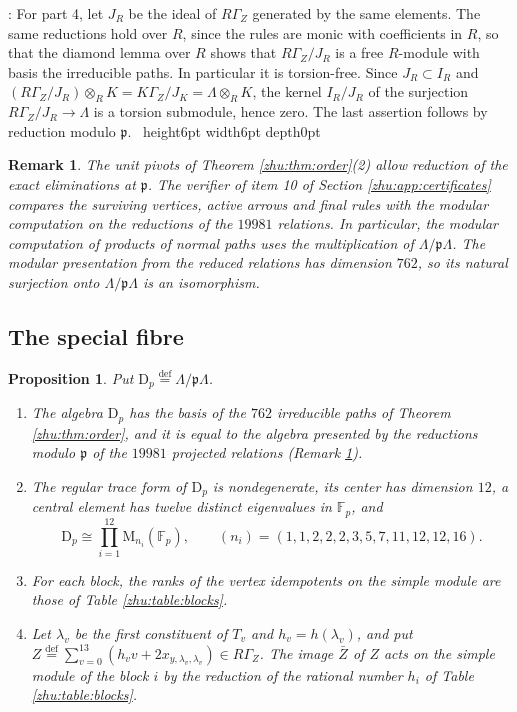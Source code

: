 \documentclass[leqno]{article}
\newcommand{\D}{\mathrm{D}}
\newcommand{\M}{\mathrm{M}}
\newcommand{\qed}{\hfill \vrule height6pt  width6pt depth0pt}
\newcommand{\ot}{\otimes}
\newcommand{\ov}{\overset}
\newtheorem{prop}[thm]{Proposition}
\newtheorem{remark}[thm]{Remark}
\newenvironment{proof}[1][]{\noindent {\it Proof #1} : }{\hbox{~}\qed
\smallskip
}
\numberwithin{equation}{section}
\begin{document}
\begin{proof}
For part 4, let $J_R$ be the ideal of $R\Gamma_Z$ generated by the same elements. The same reductions hold over $R$, since the rules are monic with coefficients in $R$, so that the diamond lemma over $R$ shows that $R\Gamma_Z/J_R$ is a free $R$-module with basis the irreducible paths. In particular it is torsion-free. Since $J_R \subset I_R$ and $(R\Gamma_Z/J_R) \ot_R K = K\Gamma_Z/J_K = \Lambda \ot_R K$, the kernel $I_R/J_R$ of the surjection $R\Gamma_Z/J_R \to \Lambda$ is a torsion submodule, hence zero. The last assertion follows by reduction modulo $\mathfrak p$.
\end{proof}

\begin{remark} \normalfont
\label{zhu:rem:order-free}
The unit pivots of Theorem \ref{zhu:thm:order}(2) allow reduction of the exact eliminations at $\mathfrak p$. The verifier of item 10 of Section \ref{zhu:app:certificates} compares the surviving vertices, active arrows and final rules with the modular computation on the reductions of the $19981$ relations. In particular, the modular computation of products of normal paths uses the multiplication of $\Lambda/\mathfrak p\Lambda$. The modular presentation from the reduced relations has dimension $762$, so its natural surjection onto $\Lambda/\mathfrak p\Lambda$ is an isomorphism.
\end{remark}
\subsection{The special fibre}
\label{zhu:sec:special}

\begin{prop}
\label{zhu:prop:special}
Put $\D_p \ov{\mathrm{def}}{=} \Lambda/\mathfrak p\Lambda$.
\begin{enumerate}
\item The algebra $\D_p$ has the basis of the $762$ irreducible paths of Theorem \ref{zhu:thm:order}, and it is equal to the algebra presented by the reductions modulo $\mathfrak p$ of the $19981$ projected relations (Remark \ref{zhu:rem:order-free}).
\item The regular trace form of $\D_p$ is nondegenerate, its center has dimension $12$, a central element has twelve distinct eigenvalues in $\mathbb F_p$, and
\[
\D_p \cong \prod_{i=1}^{12} \M_{n_i}(\mathbb F_p), \qquad (n_i) = (1, 1, 2, 2, 2, 3, 5, 7, 11, 12, 12, 16).
\]
\item For each block, the ranks of the vertex idempotents on the simple module are those of Table \ref{zhu:table:blocks}.
\item Let $\lambda_v$ be the first constituent of $T_v$ and $h_v = h(\lambda_v)$, and put $Z \ov{\mathrm{def}}{=} \sum_{v=0}^{13} (h_v v + 2 x_{y,\lambda_v,\lambda_v}) \in R\Gamma_Z$. The image $\bar Z$ of $Z$ acts on the simple module of the block $i$ by the reduction of the rational number $h_i$ of Table \ref{zhu:table:blocks}.
\end{enumerate}
\end{prop}
\end{document}
